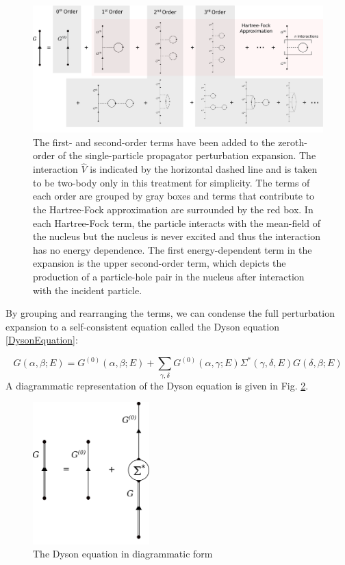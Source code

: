 \begin{figure}
    \centering
    \includegraphics[width=\textwidth]{figures/SecondOrder.png}
    \caption[The single-particle propagator perturbation expansion, to second order]
    {The first- and second-order terms have been added to the zeroth-order of the
        single-particle propagator perturbation expansion.
        The interaction $\hat{V}$ is indicated by the horizontal
        dashed line and is taken to be two-body only in this treatment for simplicity.
        The terms of each order are grouped by gray boxes and terms that contribute to
        the Hartree-Fock approximation are surrounded by the red box. In each Hartree-Fock
        term, the particle interacts with the mean-field of the nucleus but
        the nucleus is never excited and thus the interaction has no energy dependence. The first
        energy-dependent term in the expansion is the upper second-order term, which depicts
        the production of a particle-hole pair in the nucleus after interaction with the
        incident particle.}
    \label{PerturbationExpansionDiagram}
\end{figure}

By grouping and rearranging the terms, we can condense the full perturbation expansion to a
self-consistent equation called the Dyson equation \ref{DysonEquation}:

\begin{equation} \label{DysonEquation}
    G(\alpha,\beta;E) = G^{(0)}(\alpha,\beta;E) +
    \sum_{\gamma,\delta}G^{(0)}(\alpha,\gamma;E)\Sigma^{*}(\gamma,\delta,E)G(\delta, \beta; E)
\end{equation}
\noindent
A diagrammatic representation of the Dyson equation is given in Fig. \ref{DysonEquationDiagram}.

\begin{figure}[ht!]
    \centering
    \includegraphics[width=0.4\textwidth]{figures/DysonEquation.png}
    \caption{The Dyson equation in diagrammatic form}
    \label{DysonEquationDiagram}
\end{figure}


